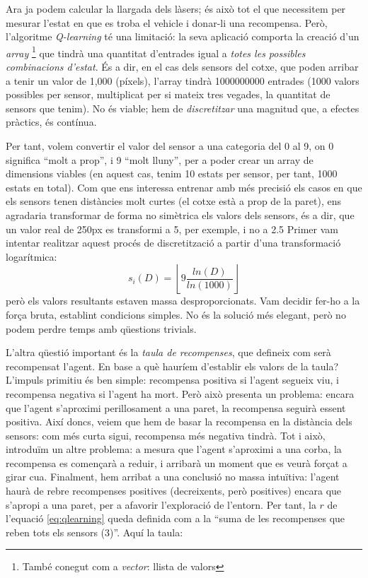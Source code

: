 Ara ja podem calcular la llargada dels làsers; és això tot el que necessitem per mesurar l'estat
en que es troba el vehicle i donar-li una recompensa. Però, l'algoritme \emph{Q-learning} té una limitació: la seva aplicació
comporta la creació d'un \emph{array} \footnote{També conegut com a \emph{vector}: llista de valors}
que tindrà una quantitat d'entrades igual a \emph{totes les possibles combinacions d'estat}. És a dir,
en el cas dels sensors del cotxe, que poden arribar a tenir un valor de 1,000 (píxels), l'array
tindrà \num{1000000000} entrades (1000 valors possibles per sensor, multiplicat per si mateix tres vegades, la quantitat
de sensors que tenim). No és viable; hem de \emph{discretitzar} una magnitud que, a efectes pràctics, és contínua.

Per tant, volem convertir el valor del sensor a una categoria del 0 al 9, on 0 significa ``molt a prop'', i 9 ``molt lluny'',
per a poder crear un array de dimensions viables (en aquest cas, tenim 10 estats per sensor, per tant, 1000 estats en total).
Com que ens interessa entrenar amb més precisió els casos en que els sensors tenen distàncies molt curtes (el cotxe està a 
prop de la paret), ens agradaria transformar de forma no simètrica els valors dels sensors, és a dir, que un valor real de
250px es transformi a 5, per exemple, i no a 2.5
Primer vam intentar realitzar aquest procés de discretització a partir d'una transformació logarítmica:
\begin{equation}
s_i(D) = \left\lfloor 9 \frac{ln(D)}{ln(1000)} \right\rfloor
\end{equation}
però els valors resultants estaven massa desproporcionats. Vam decidir fer-ho a la força bruta, establint condicions
simples. No és la solució més elegant, però no podem perdre temps amb qüestions trivials.

L'altra qüestió important és la \emph{taula de recompenses}, que defineix com serà recompensat l'agent. En base a què
hauríem d'establir els valors de la taula? L'impuls primitiu és ben simple: recompensa positiva si l'agent segueix viu,
i recompensa negativa si l'agent ha mort. Però això presenta un problema: encara que l'agent s'aproximi perillosament 
a una paret, la recompensa seguirà essent positiva. Així doncs, veiem que hem de basar la recompensa en la distància dels sensors:
com més curta sigui, recompensa més negativa tindrà. Tot i això, introduïm un altre problema: a mesura que l'agent s'aproximi a una
corba, la recompensa es començarà a reduir, i arribarà un moment que es veurà forçat a girar cua. Finalment, hem arribat a una conclusió
no massa intuïtiva: l'agent haurà de rebre recompenses positives (decreixents, però positives) encara que s'apropi a una paret, per a
afavorir l'exploració de l'entorn. Per tant, la \(r\) de l'equació \ref{eq:qlearning} queda definida
com a la ``suma de les recompenses que reben tots els sensors (3)''. Aquí la taula:

